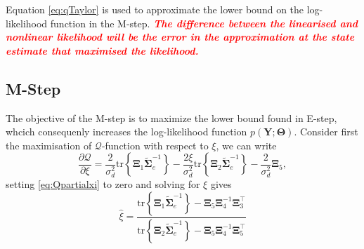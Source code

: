 \documentclass[]{article}
\newcommand{\dean}[1]{\textsf{\emph{\textbf{\textcolor{red}{#1}}}}}
\begin{document}
Equation \ref{eq:qTaylor} is used to approximate the lower bound on the log-likelihood function in the M-step. \dean{The difference between the linearised and nonlinear likelihood will be the error in the approximation at the state estimate that maximised the likelihood.}
\subsection{M-Step}
The objective of the M-step is to maximize the lower bound found in E-step, whcich consequenly increases the log-likelihood function $p(\mathbf Y;\boldsymbol\Theta)$.
                                                                                                                                                                                                                                                                                                                                                                                                                                                                            Consider first the maximisation of $\mathcal{Q}$-function with respect to $\xi$, we can write
\begin{equation}\label{eq:Qpartialxi}
 \frac{\partial \mathcal Q}{\partial\xi}=\frac{2}{\sigma_d^2}\mathrm{tr}\left\lbrace \boldsymbol\Xi_1 \tilde{\boldsymbol\Sigma}_e^{-1}\right\rbrace -\frac{2\xi}{\sigma_d^2}\mathrm{tr}\left\lbrace \boldsymbol\Xi_2 \tilde{\boldsymbol\Sigma}_e^{-1}\right\rbrace-\frac{2}{\sigma_d^2}\boldsymbol\Xi_5,
\end{equation}
setting \eqref{eq:Qpartialxi} to zero and solving for $\xi$ gives
\begin{equation}
 \hat{\xi}=\frac{\mathrm{tr}\left\lbrace \boldsymbol\Xi_1 \tilde{\boldsymbol\Sigma}_e^{-1}\right\rbrace-\boldsymbol\Xi_5\boldsymbol\Xi_4^{-1}\boldsymbol\Xi_3^\top}{\mathrm{tr}\left\lbrace \boldsymbol\Xi_2 \tilde{\boldsymbol\Sigma}_e^{-1}\right\rbrace-\boldsymbol\Xi_5\boldsymbol\Xi_4^{-1}\boldsymbol\Xi_5^{\top}}
\end{equation}
\end{document}
